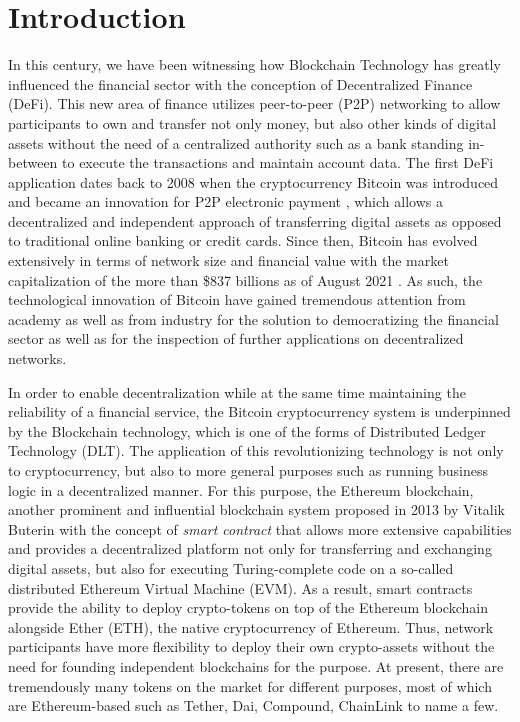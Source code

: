 
\chapter{Introduction}\label{chapter:introduction}
In this century, we have been witnessing how Blockchain Technology has greatly influenced the financial sector with the conception of Decentralized Finance (DeFi). This new area of finance utilizes peer-to-peer (P2P) networking to allow participants to own and transfer not only money, but also other kinds of digital assets without the need of a centralized authority such as a bank standing in-between to execute the transactions and maintain account data.
The first DeFi application dates back to 2008 when the cryptocurrency Bitcoin was introduced and became an innovation for P2P electronic payment \cite{satoshi2008peer}, which allows a decentralized and independent approach of transferring digital assets as opposed to traditional online banking or credit cards. Since then, Bitcoin has evolved extensively in terms of network size and financial value with the market capitalization of the more than \$837 billions as of August 2021 \cite{bitinfocharts}. As such, the technological innovation of Bitcoin have gained tremendous attention from academy as well as from industry for the solution to democratizing the financial sector as well as for the inspection of further applications on decentralized networks.

In order to enable decentralization while at the same time maintaining the reliability of a financial service, the Bitcoin cryptocurrency system is underpinned by the Blockchain technology, which is one of the forms of Distributed Ledger Technology (DLT). The application of this revolutionizing technology is not only to cryptocurrency, but also to more general purposes such as running business logic in a decentralized manner. For this purpose, the Ethereum blockchain, another prominent and influential blockchain system proposed in 2013 by Vitalik Buterin \cite{buterin2014next} with the concept of \textit{smart contract} that allows more extensive capabilities and provides a decentralized platform not only for transferring and exchanging digital assets, but also for executing Turing-complete code on a so-called distributed Ethereum Virtual Machine (EVM). As a result, smart contracts provide the ability to deploy crypto-tokens on top of the Ethereum blockchain alongside Ether (ETH), the native cryptocurrency of Ethereum. Thus, network participants have more flexibility to deploy their own crypto-assets without the need for founding independent blockchains for the purpose. At present, there are tremendously many tokens on the market for different purposes, most of which are Ethereum-based such as Tether, Dai, Compound, ChainLink to name a few.

